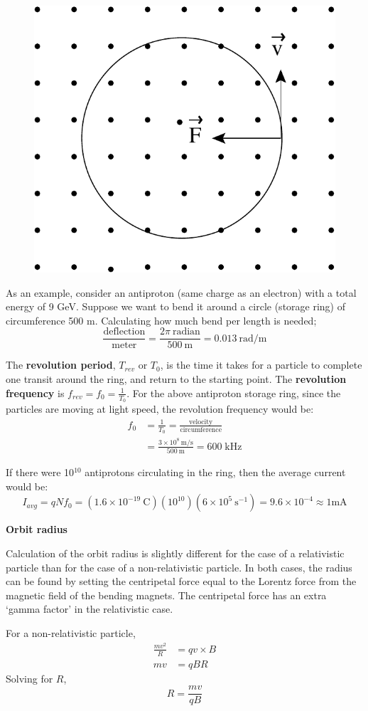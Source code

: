 \documentclass[12pt]{article}
\begin{document}
\begin{flushleft}
\vspace{.3in}
\begin{figure}[h]
\centering
\includegraphics*[width=.3\columnwidth]{ptraj.pdf}
\end{figure}

As an example, consider an antiproton (same charge as an electron) with a total energy of 9 GeV.  Suppose we want to bend it around a circle (storage ring) of circumference 500 m.  Calculating how much bend per 
length is needed;
\[
\frac{\mbox{deflection}}{\mbox{meter}}= 
\frac{2\pi \:\mbox{radian}}{500 \: \mbox{m}}
 = 0.013 \: \mbox{rad/m}
\]

The {\bf revolution period}, $T_{rev}$ or $T_{0}$, is the time it takes for a particle to complete one transit around the ring, and return to the starting point.  The {\bf revolution frequency} is $f_{rev}=f_{0}=\frac{1}{T_{0}}$.  For the above antiproton storage ring, since the particles are moving at light speed, the revolution frequency would be:\\
\begin{align*}
f_{0} & =\frac{1}{T_{0}}=\frac{\mbox{velocity}}{\mbox{circumference}}\\
        & =\frac{3 \times 10^{8} \:\text{m/s}}{500 \:\text{m}} = 600 \; \mbox{kHz}
\end{align*}

If there were 10$^{10}$ antiprotons circulating in the ring, then the average current would be:
\[
I_{avg}=qNf_{0}=(1.6 \times 10^{-19}\:\text{C})(10^{10})(6 \times 10^{5} \:\text{s}^{-1})=9.6 \times 10^{-4} \approx 1 \mbox{mA}
\]


{\bf Orbit radius}

Calculation of the orbit radius is slightly different for the case of a relativistic particle than for the case of a non-relativistic particle.  In both cases, the radius can  be found by setting the centripetal force equal to the Lorentz force from the magnetic field of the bending magnets.   The centripetal force has an extra `gamma factor' in the relativistic case.

For a non-relativistic particle,
\begin{eqnarray*}
\frac{mv^{2}}{R} & = qv\times B\\
 mv & = qBR
\end{eqnarray*}
Solving for $R$,
\[
R = \frac{mv}{qB}
\]


\end{flushleft}
\end{document}
